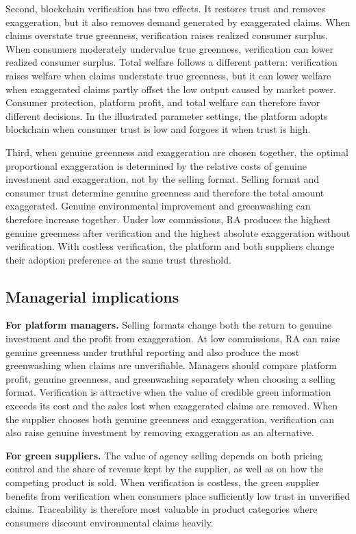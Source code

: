 \documentclass[preprint,review,12pt,authoryear,nopreprintline]{elsarticle}
\theoremstyle{definition}
\begin{document}
Second, blockchain verification has two effects. It restores trust and removes exaggeration, but it also removes demand generated by exaggerated claims. When claims overstate true greenness, verification raises realized consumer surplus. When consumers moderately undervalue true greenness, verification can lower realized consumer surplus. Total welfare follows a different pattern: verification raises welfare when claims understate true greenness, but it can lower welfare when exaggerated claims partly offset the low output caused by market power. Consumer protection, platform profit, and total welfare can therefore favor different decisions. In the illustrated parameter settings, the platform adopts blockchain when consumer trust is low and forgoes it when trust is high.

Third, when genuine greenness and exaggeration are chosen together, the optimal proportional exaggeration is determined by the relative costs of genuine investment and exaggeration, not by the selling format. Selling format and consumer trust determine genuine greenness and therefore the total amount exaggerated. Genuine environmental improvement and greenwashing can therefore increase together. Under low commissions, RA produces the highest genuine greenness after verification and the highest absolute exaggeration without verification. With costless verification, the platform and both suppliers change their adoption preference at the same trust threshold.

\subsection{Managerial implications}

\textbf{For platform managers.} Selling formats change both the return to genuine investment and the profit from exaggeration. At low commissions, RA can raise genuine greenness under truthful reporting and also produce the most greenwashing when claims are unverifiable. Managers should compare platform profit, genuine greenness, and greenwashing separately when choosing a selling format. Verification is attractive when the value of credible green information exceeds its cost and the sales lost when exaggerated claims are removed. When the supplier chooses both genuine greenness and exaggeration, verification can also raise genuine investment by removing exaggeration as an alternative.

\textbf{For green suppliers.} The value of agency selling depends on both pricing control and the share of revenue kept by the supplier, as well as on how the competing product is sold. When verification is costless, the green supplier benefits from verification when consumers place sufficiently low trust in unverified claims. Traceability is therefore most valuable in product categories where consumers discount environmental claims heavily.
\end{document}
